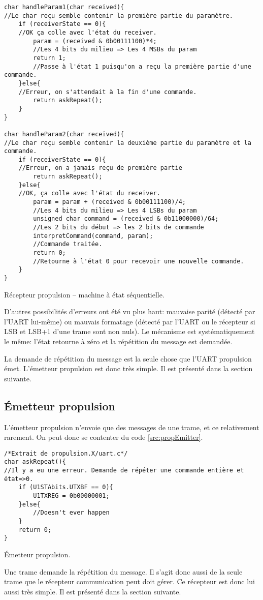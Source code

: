 \begin{listing}[htbp]
\begin{verbatim}
char handleParam1(char received){
//Le char reçu semble contenir la première partie du paramètre.
    if (receiverState == 0){
    //OK ça colle avec l'état du receiver.
        param = (received & 0b00111100)*4;
        //Les 4 bits du milieu => Les 4 MSBs du param
        return 1;
        //Passe à l'état 1 puisqu'on a reçu la première partie d'une commande.
    }else{
    //Erreur, on s'attendait à la fin d'une commande.
        return askRepeat();
    }
}

char handleParam2(char received){
//Le char reçu semble contenir la deuxième partie du paramètre et la commande.
    if (receiverState == 0){
    //Erreur, on a jamais reçu de première partie
        return askRepeat();
    }else{
    //OK, ça colle avec l'état du receiver.
        param = param + (received & 0b00111100)/4;
        //Les 4 bits du milieu => Les 4 LSBs du param
        unsigned char command = (received & 0b11000000)/64;
        //Les 2 bits du début => les 2 bits de commande
        interpretCommand(command, param);
        //Commande traitée.
        return 0;
        //Retourne à l'état 0 pour recevoir une nouvelle commande.
    }
}
\end{verbatim}
\caption{Récepteur propulsion -- machine à état séquentielle.\label{src:propReceptor}}
\end{listing}
D'autres possibilités d'erreurs ont été vu plus haut: mauvaise parité (détecté par l'UART lui-même) ou mauvais formatage (détecté par l'UART ou le récepteur si LSB et LSB+1 d'une trame sont non nuls). Le mécanisme est systématiquement le même: l'état retourne à zéro et la répétition du message est demandée.

La demande de répétition du message est la seule chose que l'UART propulsion émet. L'émetteur propulsion est donc très simple. Il est présenté dans la section suivante.

\subsection{\'Emetteur propulsion}
L'émetteur propulsion n'envoie que des messages de une trame, et ce relativement rarement. On peut donc se contenter du code \ref{src:propEmitter}.
\begin{listing}[htbp]
\begin{verbatim}
/*Extrait de propulsion.X/uart.c*/
char askRepeat(){
//Il y a eu une erreur. Demande de répéter une commande entière et état=>0.
    if (U1STAbits.UTXBF == 0){
        U1TXREG = 0b00000001;
    }else{
        //Doesn't ever happen
    }
    return 0;
}
\end{verbatim}
\caption{\'Emetteur propulsion.\label{src:propEmitter}}
\end{listing}
Une trame  demande la répétition du message. Il s'agit donc aussi de la seule trame que le récepteur communication peut doit gérer. Ce récepteur est donc lui aussi très simple. Il est présenté dans la section suivante.

